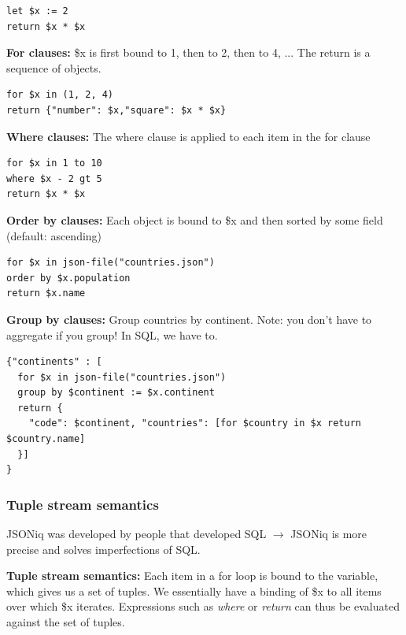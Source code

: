 \documentclass[11pt,oneside,a4paper]{article}
\begin{document}
{\begin{lstlisting}
let $x := 2
return $x * $x
\end{lstlisting}

\textbf{For clauses:} \$x is first bound to 1, then to 2, then to 4, ... The return is a sequence of objects. 

\begin{lstlisting}
for $x in (1, 2, 4)
return {"number": $x,"square": $x * $x}
\end{lstlisting}

\textbf{Where clauses:} The where clause is applied to each item in the for clause 

\begin{lstlisting}
for $x in 1 to 10
where $x - 2 gt 5
return $x * $x
\end{lstlisting}

\textbf{Order by clauses:} Each object is bound to \$x and then sorted by some field (default: ascending)

\begin{lstlisting}
for $x in json-file("countries.json")
order by $x.population
return $x.name
\end{lstlisting}

\textbf{Group by clauses:} Group countries by continent. Note: you don't have to aggregate if you group! In SQL, we have to.

\begin{lstlisting}
{"continents" : [
  for $x in json-file("countries.json")
  group by $continent := $x.continent
  return {
    "code": $continent, "countries": [for $country in $x return $country.name]
  }]
}
\end{lstlisting}

\subsubsection{Tuple stream semantics}

JSONiq was developed by people that developed SQL $\rightarrow$ JSONiq is more precise and solves imperfections of SQL.

\textbf{Tuple stream semantics:} Each item in a for loop is bound to the variable, which gives us a set of tuples. We essentially have a binding of \$x to all items over which \$x iterates. Expressions such as \textit{where} or \textit{return} can thus be evaluated against the set of tuples.

}
\end{document}
